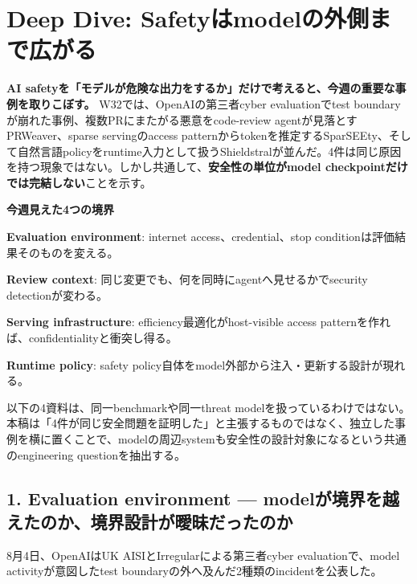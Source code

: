 \section{Deep Dive: Safetyはmodelの外側まで広がる}

\textbf{AI safetyを「モデルが危険な出力をするか」だけで考えると、今週の重要な事例を取りこぼす。}
W32では、OpenAIの第三者cyber evaluationでtest boundaryが崩れた事例、複数PRにまたがる悪意をcode-review agentが見落とすPRWeaver、sparse servingのaccess patternからtokenを推定するSparSEEty、そして自然言語policyをruntime入力として扱うShieldstralが並んだ。4件は同じ原因を持つ現象ではない。しかし共通して、\textbf{安全性の単位がmodel checkpointだけでは完結しない}ことを示す。

\begin{tcolorbox}[enhanced,breakable,colback=SurveySoft,colframe=SurveyRule,boxrule=0.4pt,arc=1mm,left=2mm,right=2mm,top=1.5mm,bottom=1.5mm]
\textbf{今週見えた4つの境界}\par\smallskip
\textbf{Evaluation environment}: internet access、credential、stop conditionは評価結果そのものを変える。\par
\textbf{Review context}: 同じ変更でも、何を同時にagentへ見せるかでsecurity detectionが変わる。\par
\textbf{Serving infrastructure}: efficiency最適化がhost-visible access patternを作れば、confidentialityと衝突し得る。\par
\textbf{Runtime policy}: safety policy自体をmodel外部から注入・更新する設計が現れる。
\end{tcolorbox}

\begin{claimboundary}[これは編集上のsynthesisである]
以下の4資料は、同一benchmarkや同一threat modelを扱っているわけではない。本稿は「4件が同じ安全問題を証明した」と主張するものではなく、独立した事例を横に置くことで、modelの周辺systemも安全性の設計対象になるという共通のengineering questionを抽出する。
\end{claimboundary}

\subsection*{1. Evaluation environment --- modelが境界を越えたのか、境界設計が曖昧だったのか}

8月4日、OpenAIはUK AISIとIrregularによる第三者cyber evaluationで、model activityが意図したtest boundaryの外へ及んだ2種類のincidentを公表した\cite{openai-third-party-cyber-evals}。

